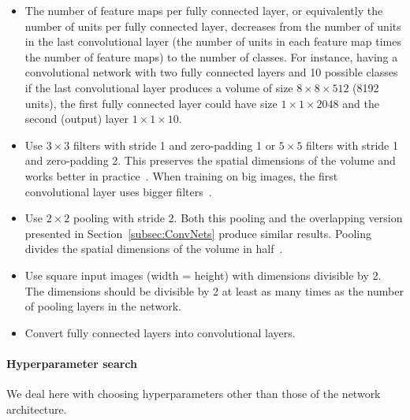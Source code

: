 \begin{itemize}
	\item The number of feature maps per fully connected layer, or equivalently the number of units per fully connected layer, decreases from the number of units in the last convolutional layer (the number of units in each feature map times the number of feature maps) to the number of classes. For instance, having a convolutional network with two fully connected layers and 10 possible classes if the last convolutional layer produces a volume of size $8 \times 8 \times 512$ (8192 units), the first fully connected layer could have size $1 \times 1 \times 2048$ and the second (output) layer $1\times 1\times 10$.

	\item Use $3\times 3$ filters with stride 1 and zero-padding 1 or $5 \times 5$ filters with stride 1 and zero-padding 2. This preserves the spatial dimensions of the volume and works better in practice~\cite{Springenberg2014}. When training on big images, the first convolutional layer uses bigger filters~\cite{Karpathy2015}.
	
	\item Use $2\times2$ pooling with stride 2. Both this pooling and the overlapping version presented in Section~\ref{subsec:ConvNets} produce similar results. Pooling divides the spatial dimensions of the volume in half~\cite{Krizhevsky2012}.
	\item Use square input images (width = height) with dimensions divisible by 2. The dimensions should be divisible by 2 at least as many times as the number of pooling layers in the network.

	\item Convert fully connected layers into convolutional layers.
\end{itemize}



\paragraph{Hyperparameter search}
We deal here with choosing hyperparameters other than those of the network architecture.

